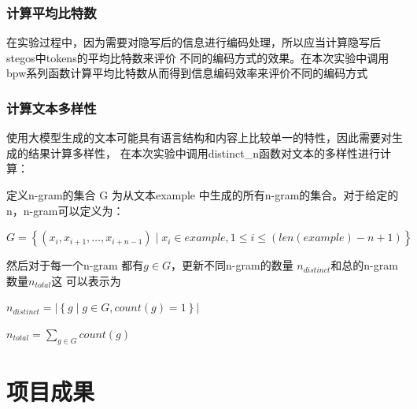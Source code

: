 \documentclass[a4paper,11pt,UTF8]{ctexart}
\begin{document}
      \subsubsection{计算平均比特数}
        在实验过程中，因为需要对隐写后的信息进行编码处理，所以应当计算隐写后stegos中tokens的平均比特数来评价
        不同的编码方式的效果。在本次实验中调用bpw系列函数计算平均比特数从而得到信息编码效率来评价不同的编码方式

      \subsubsection{计算文本多样性}
        使用大模型生成的文本可能具有语言结构和内容上比较单一的特性，因此需要对生成的结果计算多样性，
        在本次实验中调用distinct\_n函数对文本的多样性进行计算：\par
        定义n-gram的集合 G 为从文本example 中生成的所有n-gram的集合。对于给定的n，n-gram可以定义为：\par
        $G=\left \{ (x_{i},x_{i+1},\dots ,x_{i+n-1})\mid x_{i}\in example, 1\le i \le (len(example)-n+1)\right \} $\par
        然后对于每一个n-gram 都有$g\in G$，更新不同n-gram的数量 $n_{distinct}$和总的n-gram数量$n_{total}$这
        可以表示为\par
        $n_{distinct}=\left | \left \{ g\mid g\in G,count(g)=1 \right \}  \right | $\par
        $n_{total}=\sum_{g\in G}^{} count(g)$

\section{项目成果}
\setlength{\parindent}{2em}
  
\end{document}

